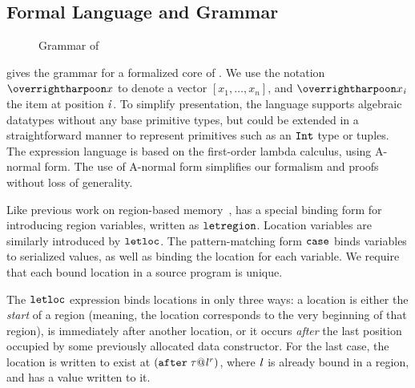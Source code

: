 \documentclass[showabstract,showacknowledgments,showpreface,showdedication]{iuphd}
\begin{document}
\subsection{Formal Language and Grammar}
\label{subsec:grammar}

\begin{figure}
  
  \caption{Grammar of \ourcalc{}}
  \label{fig:grammar}  
\end{figure}

 gives the grammar for a formalized core of \ourcalc{}.
%
We use the notation $\overharpoon{x}$ to denote a vector $[
x_1, \ldots, x_n]$, and $\overharpoon{x_{\ind}}$ the item at position
$\mathit{i}$.
%
To simplify presentation, the language supports 
algebraic datatypes without any base primitive types, but could be extended in a straightforward
manner to represent primitives such as an $\texttt{Int}$ type or tuples.
%
The expression language is based on the first-order lambda calculus,
using A-normal form.
%
The use of A-normal form simplifies our formalism and proofs
without loss of generality.

Like previous work on region-based memory~\cite{regioncalcs},
\ourcalc{} has a special binding
form for introducing region variables, written as
$\texttt{letregion}$.
%
Location variables are similarly introduced by $\texttt{letloc}$.
%
The pattern-matching form $\texttt{case}$ binds variables to
serialized values, as well as binding the location for each variable.
%
We require that each bound location in
a source program is unique.
%

The $\texttt{letloc}$ expression binds locations in only three ways:
a location is either the \emph{start} of a region (meaning, the
location corresponds to the very beginning of that region), is
immediately after another location, or it occurs \emph{after} the last
position occupied by some previously allocated data constructor.
%
For the last case, the location is written to exist at
$(\texttt{after}\; \mathit{\tau} @ {\mathit{l}}^{\mathit{r}})$, where $\mathit{l}$ is already
bound in a region, and has a value written to it.

\end{document}
